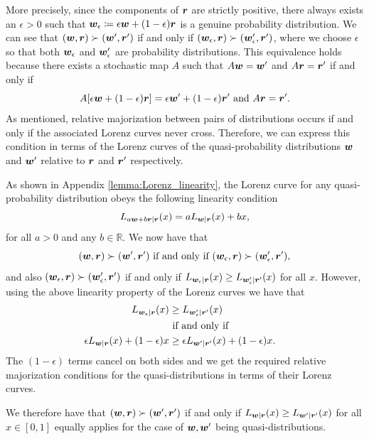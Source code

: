 \documentclass[pra,
aps,
twocolumn,
superscriptaddress,
groupedaddress,
nofootinbib,
reprint
]{revtex4-1}
\begin{document}
More precisely, since the components of $\boldsymbol{r}$ are strictly positive, there always exists an $\epsilon >0$ such that $\boldsymbol{w}_\epsilon \coloneqq \epsilon \boldsymbol{w} + (1-\epsilon) \boldsymbol{r}$ is a genuine probability distribution. We can see that $(\boldsymbol{w} , \boldsymbol{r}) \succ (\boldsymbol{w}', \boldsymbol{r}')$ if and only if $(\boldsymbol{w}_\epsilon , \boldsymbol{r}) \succ (\boldsymbol{w}_\epsilon', \boldsymbol{r}')$, where we choose $\epsilon$ so that both $\boldsymbol{w}_\epsilon$ and $\boldsymbol{w}_\epsilon'$ are probability distributions. This equivalence holds because there exists a stochastic map $A$ such that $A \boldsymbol{w} = \boldsymbol{w}'$ and $A \boldsymbol{r} = \boldsymbol{r}'$ if and only if 
\begin{equation}
A[\epsilon \boldsymbol{w} + (1-\epsilon) \boldsymbol{r}] = \epsilon \boldsymbol{w}' + (1-\epsilon) \boldsymbol{r}'\mbox{ and } A\boldsymbol{r} = \boldsymbol{r}'.
\end{equation}
As mentioned, relative majorization between pairs of distributions occurs if and only if the associated Lorenz curves never cross. Therefore, we can express this condition in terms of the Lorenz curves of the quasi-probability distributions $\boldsymbol{w}$ and $\boldsymbol{w}'$ relative to $\boldsymbol{r}$ and $\boldsymbol{r}'$ respectively.

As shown in Appendix \ref{lemma:Lorenz_linearity}, the Lorenz curve for any quasi-probability distribution obeys the following linearity condition
\begin{equation}
L_{a \boldsymbol{w} + b \boldsymbol{r} | \boldsymbol{r}} (x) = a L_{\boldsymbol{w}|\boldsymbol{r}} (x) + bx,
\end{equation}
for all $a >0$ and any $b \in \mathbb{R}$. We now have that
\begin{equation}
(\boldsymbol{w}, \boldsymbol{r}) \succ (\boldsymbol{w}', \boldsymbol{r}') \mbox{ if and only if } (\boldsymbol{w}_\epsilon , \boldsymbol{r}) \succ (\boldsymbol{w}_\epsilon', \boldsymbol{r}'),
\end{equation}
and also $(\boldsymbol{w}_\epsilon , \boldsymbol{r}) \succ (\boldsymbol{w}_\epsilon', \boldsymbol{r}')$ if and only if $L_{\boldsymbol{w}_\epsilon |\boldsymbol{r}} (x) \ge L_{\boldsymbol{w}'_\epsilon |\boldsymbol{r}'} (x)$ for all $x$. However, using the above linearity property of the Lorenz curves we have that
\begin{align}
L_{\boldsymbol{w}_\epsilon |\boldsymbol{r}} (x) &\ge L_{\boldsymbol{w}'_\epsilon |\boldsymbol{r}'} (x) \nonumber \\ 
&\mbox{ if and only if }& \nonumber \\
\epsilon L_{\boldsymbol{w} |\boldsymbol{r}} (x) + (1-\epsilon) x &\ge \epsilon L_{\boldsymbol{w}' |\boldsymbol{r}'} (x) + (1-\epsilon) x.
\end{align}
The $(1-\epsilon)$ terms cancel on both sides and we get the required relative majorization conditions for the quasi-distributions in terms of their Lorenz curves.

We therefore have that $(\boldsymbol{w}, \boldsymbol{r}) \succ (\boldsymbol{w}', \boldsymbol{r}')$ if and only if $L_{\boldsymbol{w} | \boldsymbol{r}} (x) \ge L_{\boldsymbol{w}' | \boldsymbol{r}'}(x)$ for all $x \in [0,1]$ equally applies for the case of $\boldsymbol{w},\boldsymbol{w}'$ being quasi-distributions. 
\end{document}

